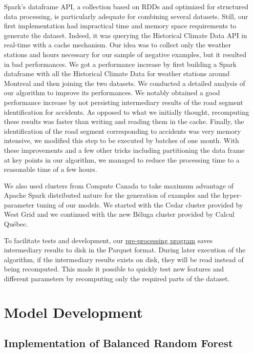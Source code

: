 \documentclass[conference]{IEEEtran}
\begin{document}
Spark's dataframe API, a collection based on RDDs and optimized for structured data processing, is particularly adequate
for combining several datasets. Still, our first implementation had impractical
time and memory space requirements to generate the dataset. Indeed, it was querying
the Historical Climate Data API in real-time with a cache mechanism. Our
idea was to collect only the weather stations and hours necessary for our
sample of negative examples, but it resulted in bad performances. We got a
performance increase by first building a Spark dataframe with all the
Historical Climate Data for weather stations around Montreal and then
joining the two datasets. We conducted a detailed analysis of our algorithm
to improve its performances. We notably obtained a good performance
increase by not persisting intermediary results of the road segment
identification for accidents. As opposed to what we initially thought,
recomputing these results was faster than writing and reading them in the
cache. Finally, the identification of the road segment corresponding to
accidents was very memory intensive, we modified this step to be executed
by batches of one month. With these improvements and a few other tricks
including partitioning the data frame at key points in our algorithm, we
managed to reduce the processing time to a reasonable time of a few hours.

We also used clusters from Compute Canada to take maximum advantage of Apache Spark distributed nature for the generation of examples and the hyper-parameter tuning of our models. We started with the Cedar cluster provided by West Grid and we continued with the new B\'eluga cluster provided by Calcul Québec.

To facilitate tests and development, our \href{https://github.com/big-data-lab-team/accident-prediction-montreal/blob/master/preprocess.py}{pre-processing program} saves intermediary results to disk in the Parquet format. During later execution of the algorithm, if the intermediary results exists on disk, they will be read instead of being recomputed. This made it possible to quickly test new features and different parameters by recomputing only the required parts of the dataset.

\section{Model Development}

\subsection{Implementation of Balanced Random Forest}
\end{document}

